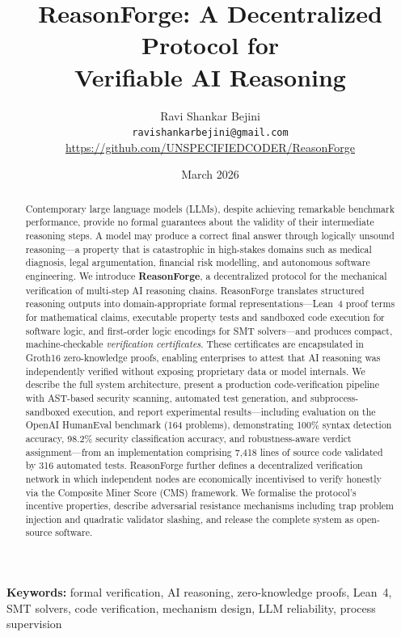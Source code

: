 \documentclass[11pt,a4paper]{article}
\title{\textbf{ReasonForge: A Decentralized Protocol for\\
Verifiable AI Reasoning}}
\author{
  Ravi Shankar Bejini\\
  \texttt{ravishankarbejini@gmail.com}\\
  \url{https://github.com/UNSPECIFIEDCODER/ReasonForge}
}
\date{March 2026}
\begin{document}
\maketitle

\begin{abstract}
Contemporary large language models (LLMs), despite achieving remarkable
benchmark performance, provide no formal guarantees about the validity of
their intermediate reasoning steps.  A model may produce a correct final
answer through logically unsound reasoning---a property that is
catastrophic in high-stakes domains such as medical diagnosis, legal
argumentation, financial risk modelling, and autonomous software
engineering.  We introduce \textbf{ReasonForge}, a decentralized protocol
for the mechanical verification of multi-step AI reasoning chains.
ReasonForge translates structured reasoning outputs into
domain-appropriate formal representations---Lean~4 proof terms for
mathematical claims, executable property tests and sandboxed code
execution for software logic, and first-order logic encodings for SMT
solvers---and produces compact, machine-checkable \emph{verification
certificates}.  These certificates are encapsulated in Groth16
zero-knowledge proofs, enabling enterprises to attest that AI reasoning
was independently verified without exposing proprietary data or model
internals.  We describe the full system architecture, present a
production code-verification pipeline with AST-based security scanning,
automated test generation, and subprocess-sandboxed execution, and report
experimental results---including evaluation on the OpenAI HumanEval
benchmark (164 problems), demonstrating 100\% syntax detection accuracy,
98.2\% security classification accuracy, and robustness-aware verdict
assignment---from an implementation comprising 7{,}418 lines of source
code validated by 316 automated tests.  ReasonForge further
defines a decentralized verification network in which independent nodes
are economically incentivised to verify honestly via the Composite Miner
Score (CMS) framework.  We formalise the protocol's incentive properties,
describe adversarial resistance mechanisms including trap problem
injection and quadratic validator slashing, and release the complete
system as open-source software.
\end{abstract}

\noindent\textbf{Keywords:}
formal verification, AI reasoning, zero-knowledge proofs, Lean~4,
SMT solvers, code verification, mechanism design, LLM reliability,
process supervision
\end{document}
